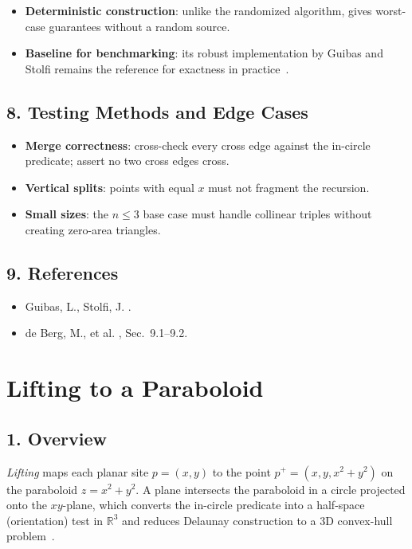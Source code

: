 \begin{itemize}
\item \textbf{Deterministic construction}: unlike the randomized algorithm,
  gives worst-case guarantees without a random source.
\item \textbf{Baseline for benchmarking}: its robust implementation by Guibas
  and Stolfi remains the reference for exactness in practice~\cite{guibas1985}.
\end{itemize}

\subsection{8. Testing Methods and Edge Cases}

\begin{itemize}
\item \textbf{Merge correctness}: cross-check every cross edge against the
  in-circle predicate; assert no two cross edges cross.
\item \textbf{Vertical splits}: points with equal $x$ must not fragment the
  recursion.
\item \textbf{Small sizes}: the $n \le 3$ base case must handle collinear
  triples without creating zero-area triangles.
\end{itemize}

\subsection{9. References}

\begin{itemize}
\item Guibas, L., Stolfi, J. \cite{guibas1985}.
\item de Berg, M., et al. \cite{deberg2008}, Sec.~9.1--9.2.
\end{itemize}

\section{Lifting to a Paraboloid}
\label{sec:delaunay_lifting}

\subsection{1. Overview}

\emph{Lifting} maps each planar site $p = (x,y)$ to the point
$p^+ = (x, y, x^2 + y^2)$ on the paraboloid $z = x^2 + y^2$. A plane intersects
the paraboloid in a circle projected onto the $xy$-plane, which converts the
in-circle predicate into a half-space (orientation) test in $\mathbb{R}^3$ and
reduces Delaunay construction to a 3D convex-hull problem~\cite{brown1979,deberg2008}.

